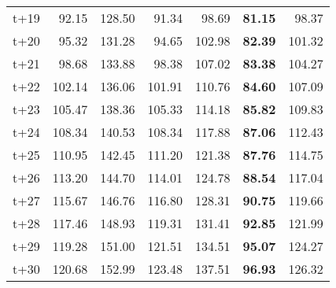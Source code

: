 \begin{table}[H]
\begin{tabular}{lrrrrrr}
t+19  & 92.15  & 128.50  & 91.34  & 98.69  & \textbf{81.15}  & 98.37  \\
t+20  & 95.32  & 131.28  & 94.65  & 102.98  & \textbf{82.39}  & 101.32  \\
t+21  & 98.68  & 133.88  & 98.38  & 107.02  & \textbf{83.38}  & 104.27  \\
t+22  & 102.14  & 136.06  & 101.91  & 110.76  & \textbf{84.60}  & 107.09  \\
t+23  & 105.47  & 138.36  & 105.33  & 114.18  & \textbf{85.82}  & 109.83  \\
t+24  & 108.34  & 140.53  & 108.34  & 117.88  & \textbf{87.06}  & 112.43  \\
t+25  & 110.95  & 142.45  & 111.20  & 121.38  & \textbf{87.76}  & 114.75  \\
t+26  & 113.20  & 144.70  & 114.01  & 124.78  & \textbf{88.54}  & 117.04  \\
t+27  & 115.67  & 146.76  & 116.80  & 128.31  & \textbf{90.75}  & 119.66  \\
t+28  & 117.46  & 148.93  & 119.31  & 131.41  & \textbf{92.85}  & 121.99  \\
t+29  & 119.28  & 151.00  & 121.51  & 134.51  & \textbf{95.07}  & 124.27  \\
t+30  & 120.68  & 152.99  & 123.48  & 137.51  & \textbf{96.93}  & 126.32  \\

\bottomrule
\end{tabular}
\end{table}
